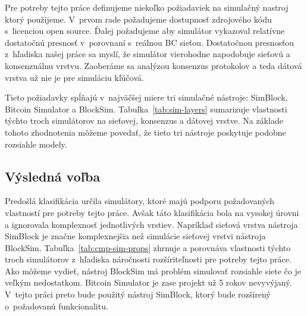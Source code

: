 Pre potreby tejto práce definujeme niekoľko požiadaviek na simulačný nastroj ktorý použijeme. V~prvom rade požadujeme dostupnosť zdrojového kódu s~licenciou open source. Ďalej požadujeme aby simulátor vykazoval relatívne dostatočnú presnosť v~porovnaní s~reálnou BC sieťou. Dostatočnou presnosťou z~hľadiska našej práce sa myslí, že simulátor vierohodne napodobuje sieťovú a konsenzuálnu vrstvu. Zaoberáme sa analýzou konsenzus protokolov a teda dátová vrstva už nie je pre simuláciu kľúčová. 

Tieto požiadavky spĺňajú v~najväčšej miere tri simulačné nástroje: SimBlock, Bitcoin Simulator a BlockSim. Tabuľka~\ref{tab:sim-layers} sumarizuje vlastnosti týchto troch simulátorov na sieťovej, konsenzus a dátovej vrstve. Na základe tohoto zhodnotenia môžeme povedať, že tieto tri nástroje poskytuje podobne rozsiahle modely.

\subsection{Výsledná voľba}

Predošlá klasifikácia určila simulátory, ktoré majú podporu požadovaných vlastností pre potreby tejto práce. Avšak táto klasifikácia bola na vysokej úrovni a ignorovala komplexnosť jednotlivých vrstiev. Napríklad sieťová vrstva nástroja SimBlock je značne komplexnejšia než simulácie sieťovej vrstvi nástroja BlockSim. Tabuľka~\ref{tab:cmp-sim-props} zhrnuje a porovnáva vlastnosti týchto troch simulátorov z~hľadiska náročnosti rozšíriteľnosti pre potreby tejto práce. Ako môžeme vydieť, nástroj BlockSim má problém simulovať rozsiahle siete čo je veľkým nedostatkom. Bitcoin Simulator je zase projekt už 5 rokov nevyvýjaný. V~tejto práci preto bude použitý nástroj SimBlock, ktorý bude rozšírený o~požadovanú funkcionalitu. 

